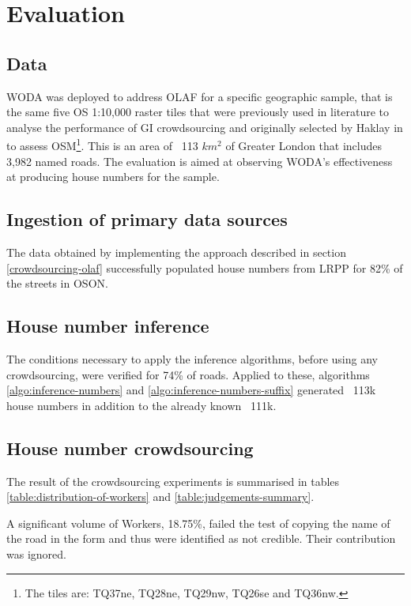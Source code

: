\section{Evaluation}

\subsection{Data}

WODA was deployed to address OLAF for a specific geographic sample, that is the same five OS 1:10,000 raster tiles that were previously used in literature to analyse the performance of GI crowdsourcing and originally selected by Haklay in \cite{Haklay:2010vs} to assess OSM\footnote{The tiles are: TQ37ne, TQ28ne, TQ29nw, TQ26se and TQ36nw.}. This is an area of ~113 $ km^2 $ of Greater London that includes 3,982 named roads. The evaluation is aimed at observing WODA's effectiveness at producing house numbers for the sample.

\subsection{Ingestion of primary data sources}

The data obtained by implementing the approach described in section \ref{crowdsourcing-olaf} successfully populated house numbers from LRPP for 82\% of the streets in OSON.

\subsection{House number inference}

The conditions necessary to apply the inference algorithms, before using any crowdsourcing, were verified for 74\% of roads. Applied to these, algorithms \ref{algo:inference-numbers} and \ref{algo:inference-numbers-suffix} generated ~113k house numbers in addition to the already known ~111k. 

\subsection{House number crowdsourcing}

The result of the crowdsourcing experiments is summarised in tables \ref{table:distribution-of-workers} and \ref{table:judgements-summary}. 

A significant volume of Workers, 18.75\%, failed the test of copying the name of the road in the form and thus were identified as not credible. Their contribution was ignored.

